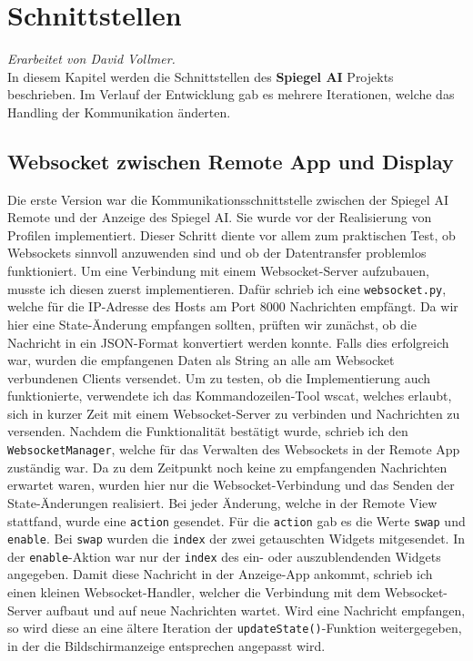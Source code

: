 \chapter{Schnittstellen}
\textit{Erarbeitet von David Vollmer.} \\
In diesem Kapitel werden die Schnittstellen des \textbf{Spiegel AI} Projekts beschrieben. Im Verlauf der Entwicklung gab es mehrere Iterationen, welche das Handling der Kommunikation änderten.

\section{Websocket zwischen Remote App und Display}
Die erste Version war die Kommunikationsschnittstelle zwischen der Spiegel AI Remote und der Anzeige des Spiegel AI. Sie wurde vor der Realisierung von Profilen implementiert. Dieser Schritt diente vor allem zum praktischen Test, ob Websockets sinnvoll anzuwenden sind und ob der Datentransfer problemlos funktioniert. Um eine Verbindung mit einem Websocket-Server aufzubauen, musste ich diesen zuerst implementieren. Dafür schrieb ich eine \texttt{websocket.py}, welche für die IP-Adresse des Hosts am Port 8000 Nachrichten empfängt. Da wir hier eine State-Änderung empfangen sollten, prüften wir zunächst, ob die Nachricht in ein JSON-Format konvertiert werden konnte. Falls dies erfolgreich war, wurden die empfangenen Daten als String an alle am Websocket verbundenen Clients versendet. Um zu testen, ob die Implementierung auch funktionierte, verwendete ich das Kommandozeilen-Tool wscat, welches erlaubt, sich in kurzer Zeit mit einem Websocket-Server zu verbinden und Nachrichten zu versenden. Nachdem die Funktionalität bestätigt wurde, schrieb ich den \texttt{WebsocketManager}, welche für das Verwalten des Websockets in der Remote App zuständig war. Da zu dem Zeitpunkt noch keine zu empfangenden Nachrichten erwartet waren, wurden hier nur die Websocket-Verbindung und das Senden der State-Änderungen realisiert. Bei jeder Änderung, welche in der Remote View stattfand, wurde eine \texttt{action} gesendet. Für die \texttt{action} gab es die Werte \texttt{swap} und \texttt{enable}. Bei \texttt{swap} wurden die \texttt{index} der zwei getauschten Widgets mitgesendet. In der \texttt{enable}-Aktion war nur der \texttt{index} des ein- oder auszublendenden Widgets angegeben. Damit diese Nachricht in der Anzeige-App ankommt, schrieb ich einen kleinen Websocket-Handler, welcher die Verbindung mit dem Websocket-Server aufbaut und auf neue Nachrichten wartet. Wird eine Nachricht empfangen, so wird diese an eine ältere Iteration der \texttt{updateState()}-Funktion weitergegeben, in der die Bildschirmanzeige entsprechen angepasst wird. \\
